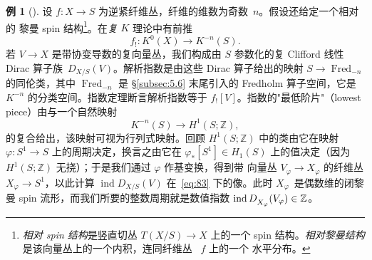 \documentclass[11pt]{amsart}
\theoremstyle{definition}
\newtheorem{example}[equation]{例}
\theoremstyle{remark}
\theoremstyle{plain}
\numberwithin{equation}{section}
\renewcommand{\:}{\colon}
\DeclareMathOperator{\Hom}{Hom}
\newcommand{\ZZ}{{\mathbb Z}}
\newcommand{\cir}{S^1}
\DeclareMathOperator{\ind}{ind}
\DeclareRobustCommand{\mstrut}{^{\vphantom{1*\prime y\vee M}}}
\DeclareMathOperator{\Fred}{Fred}
\begin{document}
  \begin{example}[]\label{thm:24}
 设 $f\:X\to S$ 为逆紧纤维丛，纤维的维数为奇数~$n$。假设还给定一个相对的
黎曼 spin 结构\footnote{\emph{相对 spin 结构}是竖直切丛 $T(X/S)\to X$ 上的一个
spin 结构。\emph{相对黎曼结构}是该向量丛上的一个内积，连同纤维丛~ $f$ 上的一个
水平分布。}。在\emph{复} $K$ 理论中有前推
  \begin{equation}\label{eq:82}
     f_!\:K^0(X)\longrightarrow K^{-n}(S).
  \end{equation}
若 $V\to X$ 是带协变导数的复向量丛，我们构成由 $S$ 参数化的复 Clifford 线性
Dirac 算子族~$D_{X/S}(V)$。解析指数是由这些 Dirac 算子给出的映射
$S\to\Fred_{-n}$ 的同伦类，其中 $\Fred_{-n}$ 是 \S\ref{subsec:5.6} 末尾引入的
Fredholm 算子空间，它是 $K^{-n}$ 的分类空间。指数定理断言解析指数等于
$f_![V]$。指数的"最低阶片"（lowest piece）由与一个自然映射
  \begin{equation}\label{eq:83}
     K^{-n}(S)\longrightarrow H^1(S;\ZZ), 
  \end{equation}
的复合给出，该映射可视为行列式映射。回顾 $H^1(S;\ZZ)$ 中的类由它在映射
$\varphi \:\cir\to S$ 上的周期决定，换言之由它在 $\varphi _*[\cir]\in H_1(S)$
上的值决定（因为 $H^1(S;\ZZ)$ 无挠）；于是我们通过 $\varphi $ 作基变换，得到带
向量丛 $V_\varphi \to X_\varphi $ 的纤维丛 $X_\varphi \to\cir$，以此计算
$\ind D_{X/S}(V)$ 在~\eqref{eq:83} 下的像。此时 $X_\varphi $~是偶数维的闭黎曼
spin 流形，而我们所要的整数周期就是数值指数 $\ind D\mstrut _{X_\varphi
}(V_\varphi )\in \ZZ$。
  \end{example}
\end{document}
